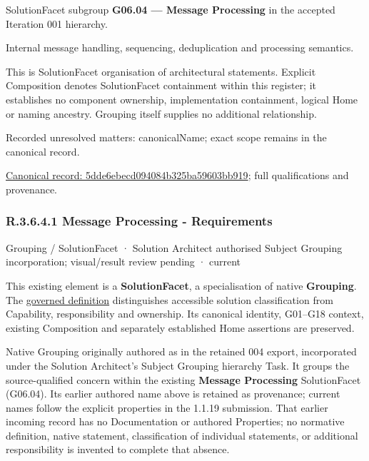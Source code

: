 SolutionFacet subgroup \textbf{G06.04 — Message Processing} in the accepted Iteration 001 hierarchy.



Internal message handling, sequencing, deduplication and processing semantics.



This is SolutionFacet organisation of architectural statements. Explicit Composition denotes SolutionFacet containment within this register; it establishes no component ownership, implementation containment, logical Home or naming ancestry. Grouping itself supplies no additional relationship.


{\small Recorded unresolved matters: canonicalName; exact scope remains in the canonical record.}\par
{\footnotesize \href{../../../../../../../continuum/grouping/5dde6ebecd094084b325ba59603bb919.md}{Canonical record: 5dde6ebecd094084b325ba59603bb919}; full qualifications and provenance.}\par
\subsubsection*{R.3.6.4.1 Message Processing - Requirements}
\label{navigation:R.3.6.4.1}

\label{element:e576768ae5cd4522b760c36d2b364be2}
{\small Grouping / SolutionFacet · Solution Architect authorised Subject Grouping incorporation; visual/result review pending · current}\par

This existing element is a \textbf{SolutionFacet}, a specialisation of native
\textbf{Grouping}. The \href{\detokenize{../../../../../../../governance/continuum-representation.md#solutionfacet-classification--1119-candidate}}{governed definition}
distinguishes accessible solution classification from Capability, responsibility
and ownership. Its canonical identity, G01–G18 context, existing Composition
and separately established Home assertions are preserved.



Native Grouping originally authored as \texttt{} in the retained 004 export,
incorporated under the Solution Architect's Subject Grouping hierarchy Task.
It groups the source-qualified \texttt{} concern within
the existing \textbf{Message Processing} SolutionFacet (G06.04). Its earlier authored name above is retained as provenance; current names
follow the explicit properties in the 1.1.19 submission.
That earlier incoming record has no Documentation or authored Properties; no normative
definition, native statement, classification of individual statements, or
additional responsibility is invented to complete that absence.



